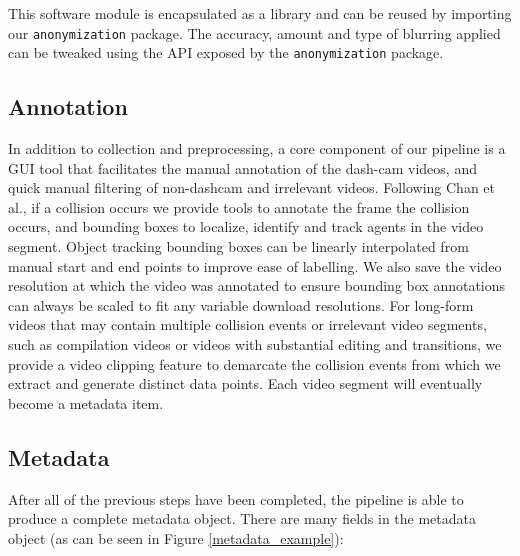 \documentclass[letterpaper, 10 pt, conference]{IEEEconf}
\begin{document}
This software module is encapsulated as a library and can be reused by importing our \texttt{anonymization} package. The accuracy, amount and type of blurring applied can be tweaked using the API exposed by the \texttt{anonymization} package.

\subsection{Annotation}

In addition to collection and preprocessing, a core component of our pipeline is a GUI tool that facilitates the manual annotation of the dash-cam videos, and quick manual filtering of non-dashcam and irrelevant videos. Following Chan et al.\cite{chan2016anticipating}, if a collision occurs we provide tools to annotate the frame the collision occurs, and bounding boxes to localize, identify and track agents in the video segment. Object tracking bounding boxes can be linearly interpolated from manual start and end points to improve ease of labelling. We also save the video resolution at which the video was annotated to ensure bounding box annotations can always be scaled to fit any variable download resolutions. For long-form videos that may contain multiple collision events or irrelevant video segments, such as compilation videos or videos with substantial editing and transitions, we provide a video clipping feature to demarcate the collision events from which we extract and generate distinct data points. 
Each video segment will eventually become a metadata item. 

\subsection{Metadata}
After all of the previous steps have been completed, the pipeline is able to produce a complete metadata object.
There are many fields in the metadata object (as can be seen in Figure \ref{metadata_example}):
\end{document}
